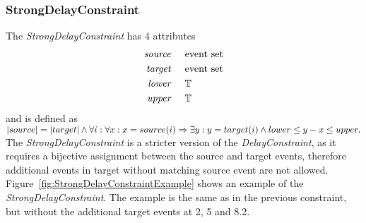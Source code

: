 	\subsubsection{StrongDelayConstraint}
		The \emph{StrongDelayConstraint} has 4 attributes
		\begin{align*}
			\emph{source} & \hspace{.5cm}\text{event set}\\
			\emph{target} & \hspace{.5cm}\text{event set}\\
			\emph{lower}  & \hspace{.5cm}\text{$\mathbb{T}$}\\
			\emph{upper}  & \hspace{.5cm}\text{$\mathbb{T}$}
		\end{align*}
		and is defined as\\[10pt]
		\begin{math}
			|source| = |target| \land\\
			\forall i: \forall x: x=source(i) \Rightarrow \exists y: y=target(i)\land lower\leq y-x\leq upper.
		\end{math}\\[10pt]
		The \emph{StrongDelayConstraint} is a stricter version of the \emph{DelayConstraint}, as it requires a bijective assignment between the source and target events, therefore additional events in target without matching source event are not allowed. Figure~\ref{fig:StrongDelayConstraintExample} shows an example of the \emph{StrongDelayConstraint}. The example is the same as in the previous constraint, but without the additional target events at 2, 5 and 8.2.
